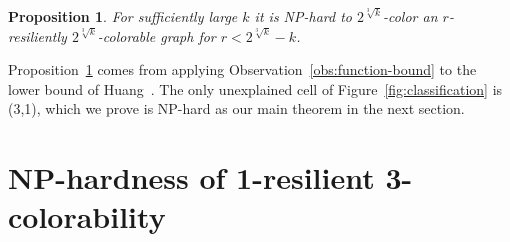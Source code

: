 \documentclass{llncs}
\newtheorem{propn}{Proposition}
\begin{document}
\begin{propn}\label{propn:asymptotic}
For sufficiently large $k$ it is NP-hard to $2^{\sqrt[3]{k}}$-color an
$r$-resiliently $2^{\sqrt[3]{k}}$-colorable graph for $r < 2^{\sqrt[3]{k}} - k$.
\end{propn}

Proposition~\ref{propn:asymptotic} comes from applying
Observation~\ref{obs:function-bound} to the lower bound of
Huang~\cite{Huang13}.  The only unexplained cell of
Figure~\ref{fig:classification} is (3,1), which we prove is NP-hard as our main
theorem in the next section.

\section{NP-hardness of 1-resilient 3-colorability}\label{sec:main-thm}

\end{document}
